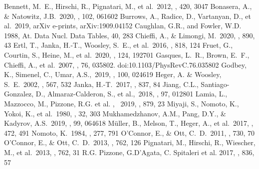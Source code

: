 \documentclass{aastex631}
\begin{document}
\begin{thebibliography}{(dummy)}
 Bennett, M.~E., Hirschi, R., Pignatari, M., et al.\ 2012, \mnras, 420, 3047
 Bonasera, A., \& Natowitz, J.B.\ 2020, \prc, 102, 061602
 Burrows, A., Radice, D., Vartanyan, D., et al.\ 2019, arXiv e-prints, arXiv:1909.04152
 Caughlan, G.R., and Fowler, W.D. 1988, At. Data Nucl. Data Tables, 40, 283
 Chieffi, A., \& Limongi, M.\ 2020, \apj, 890, 43
 Ertl, T., Janka, H.-T., Woosley, S.~E., et al.\ 2016, \apj, 818, 124
 Fruet, G., Courtin, S., Heine, M., et al.\ 2020, \prl, 124, 192701
 Gasques, L.~R., Brown, E.~F., Chieffi, A., et al.\ 2007, \prc, 76, 035802. doi:10.1103/PhysRevC.76.035802
 Godbey, K., Simenel, C., Umar, A.S.,\ 2019, \prc, 100, 024619
 Heger, A. \& Woosley, S.~E.\ 2002, \apj, 567, 532
 Janka, H.-T.\ 2017, \apj, 837, 84
 Jiang, C.L., Santiago-Gonzalez, D., Almaraz-Calderon, S., et al.,\ 2018, \prc, 97, 012801
 Lamia, L., Mazzocco, M., Pizzone, R.G. et al. , \ 2019, \apj, 879, 23 
 Miyaji, S., Nomoto, K., Yokoi, K., et al.\ 1980, \pasj, 32, 303
 Mukhamedzhanov, A.M., Pang, D.Y., \& Kadyrov, A.S.\ 2019, \prc, 99, 064618
 M{\"u}ller, B., Melson, T., Heger, A., et al.\ 2017, \mnras, 472, 491
 Nomoto, K.\ 1984, \apj, 277, 791
 O'Connor, E., \& Ott, C.~D.\ 2011, \apj, 730, 70
 O'Connor, E., \& Ott, C.~D.\ 2013, \apj, 762, 126
 Pignatari, M., Hirschi, R., Wiescher, M., et al.\ 2013, \apj, 762, 31
 R.G. Pizzone, G.D'Agata, C. Spitaleri et al. 2017, \apj, 836, 57 

\end{thebibliography}
\end{document}
